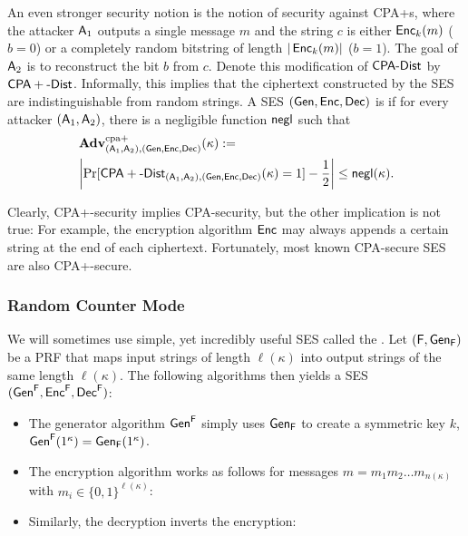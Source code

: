 An even stronger security notion is the notion of security against \acfp{CPA+}, where the
attacker $\operatorname{\mathsf{A}}_{1}$ outputs a single message $m$ and the string $c$ is either
$\operatorname{\mathsf{Enc}}_{k}(m)$ ($b=0$) or a completely random bitstring of length
$|\operatorname{\mathsf{Enc}}_{k}(m)|$ ($b=1$). The goal of $\operatorname{\mathsf{A}}_{2}$ is to reconstruct the
bit $b$ from $c$. Denote this modification of $\CPA-Dist$ by
$\CPAD-Dist$.  Informally, this implies that the ciphertext
constructed by the \ac{SES} are indistinguishable from random strings. 
A \acl{SES} $(\operatorname{\mathsf{Gen}},\operatorname{\mathsf{Enc}},\operatorname{\mathsf{Dec}})$ is  if for every
attacker $(\operatorname{\mathsf{A}}_{1},\operatorname{\mathsf{A}}_{2})$, there is a negligible function $\operatorname{\mathsf{negl}}$
such that 
\begin{align*}
  &\Adv_{(\Att_{1},\Att_{2}),(\Gen,\Enc,\Dec)}^{\cpad}(\kappa) :=\\
  &\left|\Pr[\CPAD-Dist_{(\Att_{1},\Att_{2}),(\Gen,\Enc,\Dec)}(\kappa)=1]-\frac{1}{2}\right|\leq
    \negl(\kappa).
\end{align*}

Clearly, \acs{CPA+}-security implies \acs{CPA}-security, but the other
implication is not true: For example, the encryption algorithm $\operatorname{\mathsf{Enc}}$
may always appends a certain string at the end of each
ciphertext. Fortunately, most known \ac{CPA}-secure \ac{SES} are also
\ac{CPA+}-secure. 

\subsubsection*{Random Counter Mode}
We will sometimes use simple, yet incredibly useful \ac{SES} called the
. Let $(\operatorname{\mathsf{F}},\operatorname{\mathsf{Gen}}_{\operatorname{\mathsf{F}}})$ be a \ac{PRF} that maps
input strings of length $\ell(\kappa)$ into output strings of the same
length $\ell(\kappa)$. The following algorithms then yields a
\ac{SES} $(\operatorname{\mathsf{Gen}}^{\operatorname{\mathsf{F}}},\operatorname{\mathsf{Enc}}^{\operatorname{\mathsf{F}}},\operatorname{\mathsf{Dec}}^{\operatorname{\mathsf{F}}})$:
\begin{itemize}
\item The generator algorithm $\operatorname{\mathsf{Gen}}^{\operatorname{\mathsf{F}}}$ simply uses $\operatorname{\mathsf{Gen}}_{\operatorname{\mathsf{F}}}$ to create a
  symmetric key $k$, \ie $\operatorname{\mathsf{Gen}}^{\operatorname{\mathsf{F}}}(1^{\kappa})=\operatorname{\mathsf{Gen}}_{\operatorname{\mathsf{F}}}(1^{\kappa})$. 
\item The encryption algorithm works as follows for messages
  $m=m_{1}m_{2}\ldots m_{n(\kappa)}$ with $m_{i}\in \{0,1\}^{\ell(\kappa)}$:

\item Similarly, the decryption inverts the encryption:
\end{itemize}

